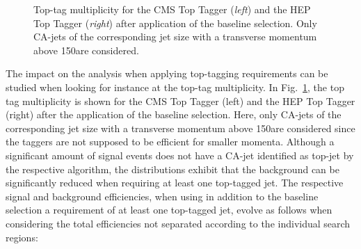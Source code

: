 \begin{figure}[!t]
  \centering
{}
  \caption{Top-tag multiplicity for the CMS Top Tagger (\textit{left}) and the HEP Top Tagger (\textit{right}) after application of the baseline selection. Only CA-jets of the corresponding jet size with a transverse momentum above 150\gev are considered.}
  \label{fig:stop_top_tag_multi}
\end{figure} 
The impact on the analysis when applying top-tagging requirements can be studied when looking for instance at the top-tag multiplicity. In Fig.~\ref{fig:stop_top_tag_multi}, the top tag multiplicity is shown for the CMS Top Tagger (left) and the HEP Top Tagger (right) after the application of the baseline selection. Here, only CA-jets of the corresponding jet size with a transverse momentum above 150\gev are considered since the taggers are not supposed to be efficient for smaller momenta. Although a significant amount of signal events does not have a CA-jet identified as top-jet by the respective algorithm, the distributions exhibit that the background can be significantly reduced when requiring at least one top-tagged jet. The respective signal and background efficiencies, when using in addition to the baseline selection a requirement of at least one top-tagged jet, evolve as follows when considering the total efficiencies not separated according to the individual search regions:
